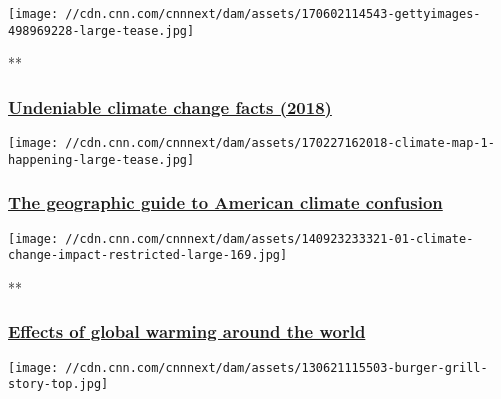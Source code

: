 \href{/videos/weather/2018/01/18/nasa-climate-change-report-2018-gray-orig-js.cnn}{}

\texttt{[image: //cdn.cnn.com/cnnnext/dam/assets/170602114543-gettyimages-498969228-large-tease.jpg]}

**

\hypertarget{undeniable-climate-change-facts-2018}{%
\subsubsection{\texorpdfstring{\href{/videos/weather/2018/01/18/nasa-climate-change-report-2018-gray-orig-js.cnn}{Undeniable
climate change facts
(2018)}}{Undeniable climate change facts (2018)}}\label{undeniable-climate-change-facts-2018}}

\href{https://www.cnn.com/2017/02/28/us/sutter-climate-opinion-maps/index.html}{}

\texttt{[image: //cdn.cnn.com/cnnnext/dam/assets/170227162018-climate-map-1-happening-large-tease.jpg]}

\hypertarget{the-geographic-guide-to-american-climate-confusion}{%
\subsubsection{\texorpdfstring{\href{https://www.cnn.com/2017/02/28/us/sutter-climate-opinion-maps/index.html}{The
geographic guide to American climate
confusion}}{The geographic guide to American climate confusion}}\label{the-geographic-guide-to-american-climate-confusion}}

\href{/2014/09/24/world/gallery/climate-change-impact/index.html}{}

\texttt{[image: //cdn.cnn.com/cnnnext/dam/assets/140923233321-01-climate-change-impact-restricted-large-169.jpg]}

**

\hypertarget{effects-of-global-warming-around-the-world}{%
\subsubsection{\texorpdfstring{\href{/2014/09/24/world/gallery/climate-change-impact/index.html}{Effects
of global warming around the
world}}{Effects of global warming around the world}}\label{effects-of-global-warming-around-the-world}}

\href{/2017/05/15/world/climate-damaging-foods/index.html}{}

\texttt{[image: //cdn.cnn.com/cnnnext/dam/assets/130621115503-burger-grill-story-top.jpg]}

